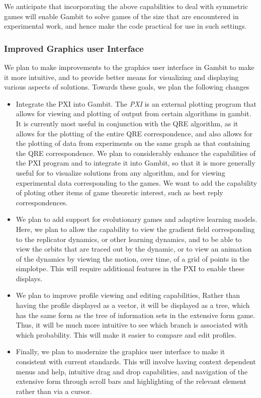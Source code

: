 \documentclass[12pt]{article}
\begin{document}
We anticipate that incorporating the above capabilities to deal with
symmetric games will enable Gambit to solve games of the size that are
encountered in experimental work, and hence make the code practical
for use in such settings.  

\subsubsection{Improved Graphics user Interface}

We plan to make improvements to the graphics user interface in Gambit
to make it more intuitive, and to provide better means for visualizing
and displaying various aspects of solutions.  Towards these goals, we
plan the following changes

\begin{itemize}
\item
Integrate the PXI into Gambit. The {\it PXI} is an external plotting
program that allows for viewing and plotting of output from certain
algorithms in gambit.  It is currently most useful in conjunction with
the QRE algorithm, as it allows for the plotting of the entire QRE
correspondence, and also allows for the plotting of data from
experiments on the same graph as that containing the QRE
correspondence.  We plan to considerably enhance the capabilities of
the PXI program and to integrate it into Gambit, so that it is more
generally useful for to visualize solutions from any algorithm, and
for viewing experimental data corresponding to the games.  We want to
add the capability of ploting other items of game theoretic interest,
such as best reply correspondences.
\item
We plan to add support for evolutionary games and adaptive learning
models.  Here, we plan to allow the capability to view the gradient
field corresponding to the replicator dynamics, or other learning
dynamics, and to be able to view the orbits that are traced out by the
dynamic, or to view an animation of the dynamics by viewing the
motion, over time, of a grid of points in the simplotpe. This will
require additional features in the PXI to enable these displays.
\item
We plan to improve profile viewing and editing capabilities, Rather
than having the profile displayed as a vector, it will be displayed as
a tree, which has the same form as the tree of information sets in the
extensive form game.  Thus, it will be much more intuitive to see
which branch is associated with which probability. This will make it
easier to compare and edit profiles.
\item
Finally, we plan to modernize the graphics user interface to make it
consistent with current standards.  This will involve having context
dependent menus and help, intuitive drag and drop capabilities, and
navigation of the extensive form through scroll bars and highlighting
of the relevant element rather than via a cursor.
\end{itemize}
\end{document}
